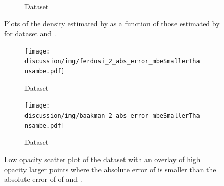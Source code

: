 \begin{figure}
\begin{subfigure}{0.23\textwidth}
		\caption{Dataset \baakmanTwo}
		\label{fig:discussion:multisphere:mbevssambe:baakmanTwo}
	\end{subfigure}	
	\caption{Plots of the density estimated by \sambe as a function of those estimated by \mbe for dataset %
		\ferdosiTwo and %
		\baakmanTwo.
	}
	\label{fig:discussion:multisphere:mbevssambe}
\end{figure}

\begin{figure}
	\centering
	\begin{subfigure}{0.23\textwidth}
		\centering
		\texttt{[image: discussion/img/ferdosi\_2\_abs\_error\_mbeSmallerThansambe.pdf]}
		\caption{Dataset \ferdosiTwo}
		\label{fig:discussion:multisphere:mbeLoweError:ferdosi2}
	\end{subfigure}
	\begin{subfigure}{0.23\textwidth}
		\centering
		\texttt{[image: discussion/img/baakman\_2\_abs\_error\_mbeSmallerThansambe.pdf]}
		\caption{Dataset \baakmanTwo}
		\label{fig:discussion:multisphere:mbeLoweError:baakmanTwo}
	\end{subfigure}	
	\caption{Low opacity scatter plot of the dataset with an overlay of high opacity larger points where the absolute error of \mbe is smaller than the absolute error of \sambe of %
		\ferdosiTwo and %
		\baakmanTwo.
	}
	\label{fig:discussion:multisphere:mbeLoweError}
\end{figure}



